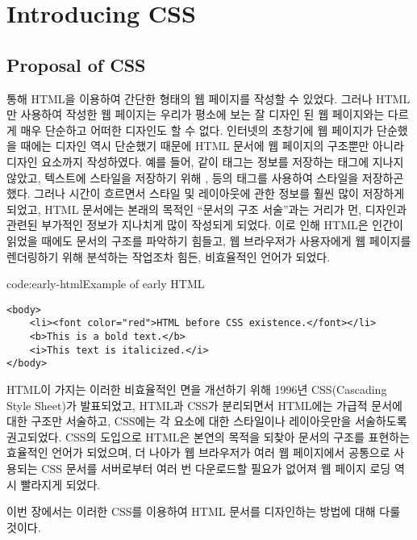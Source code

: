 \section{Introducing CSS}\label{sect:introducing-css}

\subsection*{Proposal of CSS}

\을 통해 HTML을 이용하여 간단한 형태의 웹 페이지를 작성할 수 있었다. 그러나 HTML만 사용하여 작성한 웹 페이지는 우리가 평소에 보는 잘 디자인 된 웹 페이지와는 다르게 매우 단순하고 어떠한 디자인도 할 수 없다. 인터넷의 초창기에 웹 페이지가 단순했을 때에는 디자인 역시 단순했기 때문에 HTML 문서에 웹 페이지의 구조뿐만 아니라 디자인 요소까지 작성하였다. 예를 들어, \과 같이  태그는 정보를 저장하는 태그에 지나지 않았고, 텍스트에 스타일을 저장하기 위해 ,  등의 태그를 사용하여 스타일을 저장하곤 했다. 그러나 시간이 흐르면서 스타일 및 레이아웃에 관한 정보를 훨씬 많이 저장하게 되었고, HTML 문서에는 본래의 목적인 ``문서의 구조 서술''과는 거리가 먼, 디자인과 관련된 부가적인 정보가 지나치게 많이 작성되게 되었다. 이로 인해 HTML은 인간이 읽었을 때에도 문서의 구조를 파악하기 힘들고, 웹 브라우저가 사용자에게 웹 페이지를 렌더링하기 위해 분석하는 작업조차 힘든, 비효율적인 언어가 되었다.

\begin{codeenv}{code:early-html}{Example of early HTML}\begin{verbatim}
<body>
    <li><font color="red">HTML before CSS existence.</font></li>
    <b>This is a bold text.</b>
    <i>This text is italicized.</i>
</body>
\end{verbatim}
\end{codeenv}

HTML이 가지는 이러한 비효율적인 면을 개선하기 위해 1996년 CSS(Cascading Style Sheet)가 발표되었고, HTML과 CSS가 분리되면서 HTML에는 가급적 문서에 대한 구조만 서술하고, CSS에는 각 요소에 대한 스타일이나 레이아웃만을 서술하도록 권고되었다. CSS의 도입으로 HTML은 본연의 목적을 되찾아 문서의 구조를 표현하는 효율적인 언어가 되었으며, 더 나아가 웹 브라우저가 여러 웹 페이지에서 공통으로 사용되는 CSS 문서를 서버로부터 여러 번 다운로드할 필요가 없어져 웹 페이지 로딩 역시 빨라지게 되었다.

이번 장에서는 이러한 CSS를 이용하여 HTML 문서를 디자인하는 방법에 대해 다룰 것이다.
